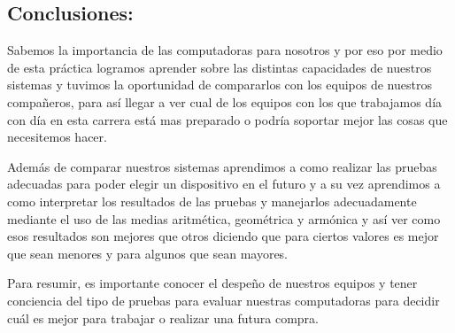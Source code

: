 \documentclass[12pt, letterpaper]{article}
\begin{document}
        \subsection*{Conclusiones:}

            \hspace{.5cm}
            Sabemos la importancia de las computadoras para nosotros y por eso por medio 
            de esta práctica logramos aprender sobre las distintas capacidades de nuestros 
            sistemas y tuvimos la oportunidad de compararlos con los equipos de nuestros 
            compañeros, para así llegar a ver cual de los equipos con los que trabajamos 
            día con día en esta carrera está mas preparado o podría soportar mejor las 
            cosas que necesitemos hacer.\vspace{.3cm}

            Además de comparar nuestros sistemas aprendimos a como realizar las pruebas 
            adecuadas para poder elegir un dispositivo en el futuro y a su vez aprendimos 
            a como interpretar los resultados de las pruebas y manejarlos adecuadamente 
            mediante el uso de las medias aritmética, geométrica y armónica y así ver como 
            esos resultados son mejores que otros diciendo que para ciertos valores es 
            mejor que sean menores y para algunos que sean mayores.\vspace{.3cm}

            Para resumir, es importante conocer el despeño de nuestros equipos y tener 
            conciencia del tipo de pruebas para evaluar nuestras computadoras para decidir 
            cuál es mejor para trabajar o realizar una futura compra. 


  
\end{document}

